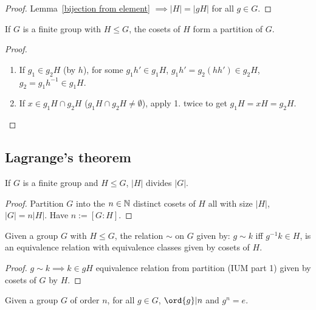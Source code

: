 \documentclass[../Year1/Year1.tex]{subfiles}
\begin{document}
\begin{proof}
    Lemma~\ref{bijection from element} $\implies |H|=|gH|$ for all $g\in G$.
\end{proof}

\begin{lemma}
    If $G$ is a finite group with $H\leq G$, the  cosets of $H$ form a partition of $G$.
\end{lemma}

\begin{proof}
    \begin{enumerate}
        \item If $g_1\in g_2H$ (by $h$), for some $g_1h'\in g_1H$, $g_1h'=g_2(hh')\in g_2H$, $g_2=g_1h^{-1}\in g_1H$.
        \item If $x\in g_1H\cap g_2H$ ($g_1H\cap g_2H\neq\emptyset$), apply 1. twice to get $g_1 H= xH = g_2 H$.
    \end{enumerate}
\end{proof}

\subsection{Lagrange's theorem}

\begin{theorem}
    If $G$ is a finite group and $H\leq G$, $|H|$ divides $|G|$.
\end{theorem}

\begin{proof}
    Partition $G$ into the $n\in\mathbb{N}$ distinct cosets of $H$ all with size $|H|$, $|G|=n|H|$. Have $n:=[G:H]$.
\end{proof}

\begin{corollary}
    Given a group $G$ with $H\leq G$, the relation $\sim$ on $G$ given by: $g\sim k$ iff $g^{-1}k\in H$, is an equivalence relation with equivalence classes given by cosets of $H$.
\end{corollary}

\begin{proof}
    $g\sim k\implies k\in gH$ equivalence relation from partition (IUM part 1) given by cosets of $G$ by $H$.
\end{proof}

\begin{corollary}\label{lagrange for elements}
    Given a group $G$ of order $n$, for all $g\in G$, $\ord{g}|n$ and $g^n=e$.
\end{corollary}
\end{document}
